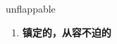 
\begin{frame}
{\huge unflappable}
\begin{center}
\begin{enumerate}\Large
  \item \textbf{镇定的，从容不迫的}
\end{enumerate}
\end{center}
\end{frame}
